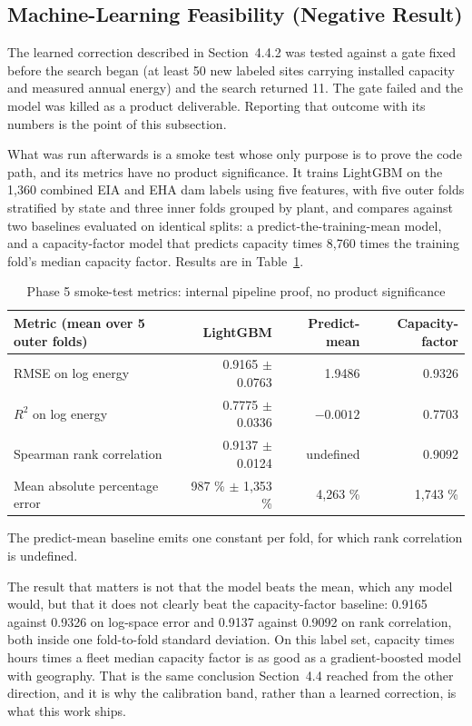 \documentclass[12pt,letterpaper]{report}
\begin{document}
\subsection{Machine-Learning Feasibility (Negative Result)} %

The learned correction described in Section~4.4.2 was tested against a gate fixed
before the search began (at least 50 new labeled sites carrying installed
capacity and measured annual energy) and the search returned 11. The gate
failed and the model was killed as a product deliverable. Reporting that outcome
with its numbers is the point of this subsection.

What was run afterwards is a smoke test whose only purpose is to prove the code
path, and its metrics have no product significance. It trains LightGBM on the
1{,}360 combined EIA and EHA dam labels using five features, with five outer folds
stratified by state and three inner folds grouped by plant, and compares against
two baselines evaluated on identical splits: a predict-the-training-mean model,
and a capacity-factor model that predicts capacity times 8{,}760 times the
training fold's median capacity factor. Results are in Table~\ref{tab:smoke}.

\begin{table}[htbp]
\centering
\caption{Phase 5 smoke-test metrics: internal pipeline proof, no product
significance}
\label{tab:smoke}
\small
\begin{tabular}{@{}lrrr@{}}
\toprule
Metric (mean over 5 outer folds) & LightGBM & Predict-mean & Capacity-factor \\
\midrule
RMSE on log energy & 0.9165 $\pm$ 0.0763 & 1.9486 & 0.9326 \\
$R^2$ on log energy & 0.7775 $\pm$ 0.0336 & $-0.0012$ & 0.7703 \\
Spearman rank correlation & 0.9137 $\pm$ 0.0124 & undefined & 0.9092 \\
Mean absolute percentage error & 987 \% $\pm$ 1{,}353 \% & 4{,}263 \% & 1{,}743 \% \\
\bottomrule
\end{tabular}

\vspace{0.4em}
{\footnotesize The predict-mean baseline emits one constant per fold, for which
rank correlation is undefined.}
\end{table}

The result that matters is not that the model beats the mean, which any model
would, but that it does not clearly beat the capacity-factor baseline: 0.9165
against 0.9326 on log-space error and 0.9137 against 0.9092 on rank correlation,
both inside one fold-to-fold standard deviation. On this label set, capacity
times hours times a fleet median capacity factor is as good as a gradient-boosted
model with geography. That is the same conclusion Section~4.4 reached from the
other direction, and it is why the calibration band, rather than a learned
correction, is what this work ships.
\end{document}
